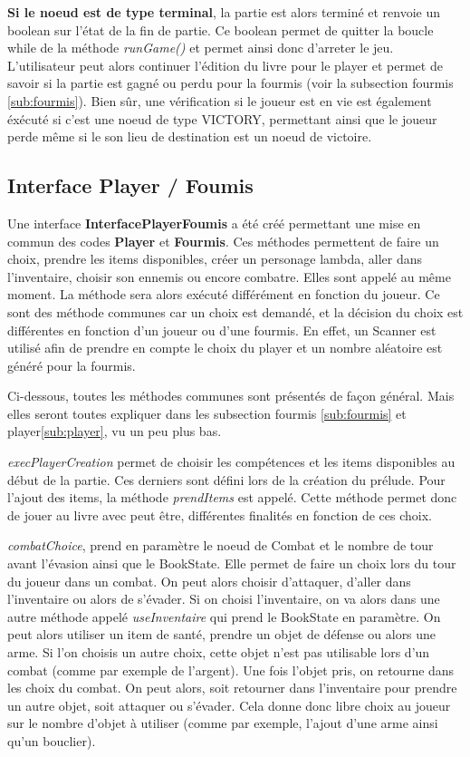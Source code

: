 		\textbf{Si le noeud est de type terminal}, la partie est alors terminé et renvoie un boolean sur l'état de la fin de partie. Ce boolean permet de quitter la boucle while de la méthode \textit{runGame()} et permet ainsi donc d'arreter le jeu. L'utilisateur peut alors continuer l'édition du livre pour le player et permet de savoir si la partie est gagné ou perdu pour la fourmis (voir la subsection fourmis \ref{sub:fourmis}). Bien sûr, une vérification si le joueur est en vie est également éxécuté si c'est une noeud de type VICTORY, permettant ainsi que le joueur perde même si le son lieu de destination est un noeud de victoire.

	\subsection{Interface Player / Foumis}
		Une interface \textbf{InterfacePlayerFoumis} a été créé permettant une mise en commun des codes \textbf{Player} et \textbf{Fourmis}. Ces méthodes permettent de faire un choix, prendre les items disponibles, créer un personage lambda, aller dans l'inventaire, choisir son ennemis ou encore combatre. Elles sont appelé au même moment. La méthode sera alors exécuté différément en fonction du joueur. Ce sont des méthode communes car un choix est demandé, et la décision du choix est différentes en fonction d'un joueur ou d'une fourmis. En effet, un Scanner est utilisé afin de prendre en compte le choix du player et un nombre aléatoire est généré pour la fourmis.

		Ci-dessous, toutes les méthodes communes sont présentés de façon général. Mais elles seront toutes expliquer dans les subsection fourmis \ref{sub:fourmis} et player\ref{sub:player}, vu un peu plus bas.

		\textit{execPlayerCreation} permet de choisir les compétences et les items disponibles au début de la partie. Ces derniers sont défini lors de la création du prélude. Pour l'ajout des items, la méthode \textit{prendItems} est appelé. Cette méthode permet donc de jouer au livre avec peut être, différentes finalités en fonction de ces choix.

		\textit{combatChoice}, prend en paramètre le noeud de Combat et le nombre de tour avant l'évasion ainsi que le BookState. Elle permet de faire un choix lors du tour du joueur dans un combat. On peut alors choisir d'attaquer, d'aller dans l'inventaire ou alors de s'évader. Si on choisi l'inventaire, on va alors dans une autre méthode appelé \textit{useInventaire} qui prend le BookState en paramètre. On peut alors utiliser un item de santé, prendre un objet de défense ou alors une arme. Si l'on choisis un autre choix, cette objet n'est pas utilisable lors d'un combat (comme par exemple de l'argent). Une fois l'objet pris, on retourne dans les choix du combat. On peut alors, soit retourner dans l'inventaire pour prendre un autre objet, soit attaquer ou s'évader. Cela donne donc libre choix au joueur sur le nombre d'objet à utiliser (comme par exemple, l'ajout d'une arme ainsi qu'un bouclier).

